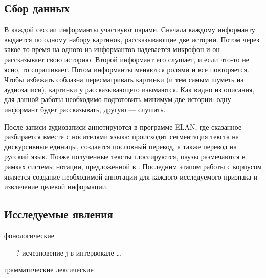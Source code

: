 \subsection{Сбор данных}
\noindent В каждой сессии информанты участвуют парами. Сначала каждому информанту выдается по одному набору картинок, рассказывающие две истории. Потом через какое-то время на одного из информантов надевается микрофон и он рассказывает свою историю. Второй информант его слушает, и если что-то не ясно, то спрашивает. Потом информанты меняются ролями и все повторяется. Чтобы избежать соблазна пересматривать картинки (и тем самым шуметь на аудиозаписи), картинки у рассказывающего изымаются. Как видно из описания, для данной работы необходимо подготовить минимум две истории: одну информант будет рассказывать, другую --- слушать.
\par После записи аудиозаписи аннотируются в программе ELAN, где сказанное разбирается вместе с носителями языка: происходит сегментация текста на дискурсивные единицы, создается пословный перевод, а также перевод на русский язык. Позже полученные тексты глоссируются, паузы размечаются в рамках системы нотации, предложенной в \citep{kibrik14}. Последним этапом работы с корпусом является создание необходимой аннотации для каждого исследуемого признака и извлечение целевой информации.
\subsection{Исследуемые явления}
\begin{itemize}
\mytem фонологические
\begin{itemize}
\mytem скорость речи
\mytem длительность сегментов и их составляющих
\begin{itemize}
\mytem длительность гласных
\mytem VOT стопов и аффрикат
\mytem длительность фрикативных
\end{itemize}
\mytem форманты гласных
\mytem спектральная характеристика фрикативных
\mytem чередование ɐ $\sim$ a
\item[?] исчезновение j в интервокале
\mytem \dots
\end{itemize}
\mytem грамматические
\mytem лексические
\end{itemize}
